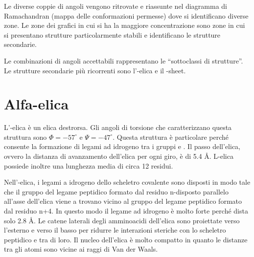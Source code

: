 
Le diverse coppie di angoli vengono ritrovate e riassunte nel diagramma
di Ramachandran (mappa delle conformazioni permesse) dove si
identificano diverse zone.
Le zone dei grafici in cui si ha la maggiore concentrazione sono zone in
cui si presentano strutture particolarmente stabili e identificano le
strutture secondarie.



Le combinazioni di angoli accettabili rappresentano le ``sottoclassi di
strutture''. Le strutture secondarie più ricorrenti sono l'\alpha-elica
e il \beta-sheet.

\clearpage

\section{Alfa-elica}

L'\alpha-elica è un elica destrorsa. Gli angoli di torsione che
caratterizzano questa struttura sono \( \Phi = -57^{\circ} \) e \( \Psi = -47^{\circ} \).
Questa struttura è particolare perché consente la formazione di legami
ad idrogeno tra i gruppi  e . Il passo dell'elica,
ovvero la distanza di avanzamento dell'elica per ogni giro, è di 5.4
\AA. L\alpha-elica possiede inoltre una lunghezza media di circa 12
residui.

\begingroup {} \endgroup

Nell'\alpha-elica, i legami a idrogeno dello scheletro covalente sono
disposti in modo tale che il gruppo  del legame peptidico
formato dal residuo n-disposto parallelo all'asse dell'elica viene a
trovano vicino al gruppo  del legame peptidico formato dal
residuo n+4. In questo modo il legame ad idrogeno è molto forte perché
dista solo 2.8 \AA. Le catene laterali degli amminoacidi dell'elica sono
proiettate verso l'esterno e verso il basso per ridurre le interazioni
steriche con lo scheletro peptidico e tra di loro. Il nucleo dell'elica
è molto compatto in quanto le distanze tra gli atomi sono vicine ai
raggi di Van der Waals.

